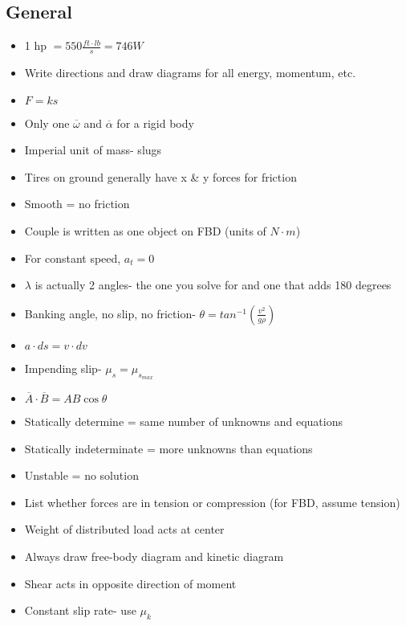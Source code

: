 \documentclass [10pt] {article}
\begin{document}
\begin{multicols*}{2}
\section{General}
	\begin{itemize}
		\item 1 hp $= 550 \frac{ft\cdot lb}{s} = 746 W $
		\item Write directions and draw diagrams for all energy, momentum, etc.
		\item $ F = ks$
		\item Only one $\overline{\omega}$ and $\overline{\alpha}$ for a rigid body 
		\item Imperial unit of mass- slugs 
		\item Tires on ground generally have x \& y forces for friction 
		\item Smooth = no friction 
		\item Couple is written as one object on FBD (units of $N\cdot m$) 
		\item For constant speed, $a_t = 0$ 
		\item $\lambda$ is actually 2 angles- the one you solve for and one that adds 180 degrees 
		\item Banking angle, no slip, no friction- $\theta = tan^{-1}\left(\frac{v^2}{g\rho}\right)$ 
		\item $a\cdot ds = v\cdot dv$ 
		\item Impending slip- $\mu_s = \mu_{s_{max}}$ 
		\item $\overline{A} \cdot \overline{B} = AB\cos\theta $ 
		\item Statically determine = same number of unknowns and equations 
		\item Statically indeterminate = more unknowns than equations 
		\item Unstable = no solution 
		\item List whether forces are in tension or compression (for FBD, assume tension) 
		\item Weight of distributed load acts at center 
		\item Always draw free-body diagram and kinetic diagram 
		\item Shear acts in opposite direction of moment 
		\item Constant slip rate- use $\mu_k$  
	\end{itemize}
\end{multicols*}
\end{document}
